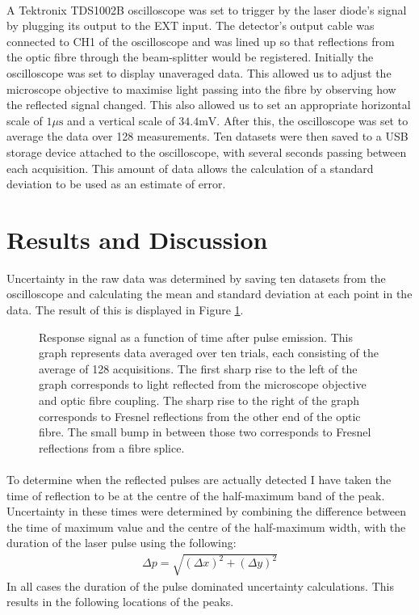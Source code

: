 \paragraph*{}
A Tektronix TDS1002B oscilloscope was set to trigger by the laser diode's signal by plugging its output to the EXT input. 
The detector's output cable was connected to CH1 of the oscilloscope and was lined up so that reflections from the optic fibre through the beam-splitter would be registered.
Initially the oscilloscope was set to display unaveraged data. This allowed us to adjust the microscope objective to maximise light passing into the fibre by observing how the reflected signal changed.
This also allowed us to set an appropriate horizontal scale of $1\mu\text{s}$ and a vertical scale of $34.4 \text{mV}$.
After this, the oscilloscope was set to average the data over 128 measurements.
Ten datasets were then saved to a USB storage device attached to the oscilloscope, with several seconds passing between each acquisition.
This amount of data allows the calculation of a standard deviation to be used as an estimate of error.


\section{Results and Discussion}
Uncertainty in the raw data was determined by saving ten datasets from the oscilloscope and calculating the mean and standard deviation at each point in the data. The result of this is displayed in Figure \ref{fig:vt}.
\begin{figure}[h]
	\centering
	
	\caption{\small Response signal as a function of time after pulse emission. 
	This graph represents data averaged over ten trials, 
	each consisting of the average of 128 acquisitions. 
	The first sharp rise to the left of the graph corresponds to light reflected from the microscope objective and optic fibre coupling.
	The sharp rise to the right of the graph corresponds to Fresnel reflections from the other end of the optic fibre. 
	The small bump in between those two corresponds to Fresnel reflections from a fibre splice.}
	\label{fig:vt}
\end{figure}

\paragraph*{}
To determine when the reflected pulses are actually detected I have taken the time of reflection to be at the centre of the half-maximum band of the peak.
Uncertainty in these times were determined by combining the difference between the time of maximum value and the centre of the half-maximum width, with the duration of the laser pulse using the following:
\begin{align*}
	\Delta p = \sqrt{(\Delta x)^2 + (\Delta y)^2}
\end{align*}
In all cases the duration of the pulse dominated uncertainty calculations.
This results in the following locations of the peaks.

